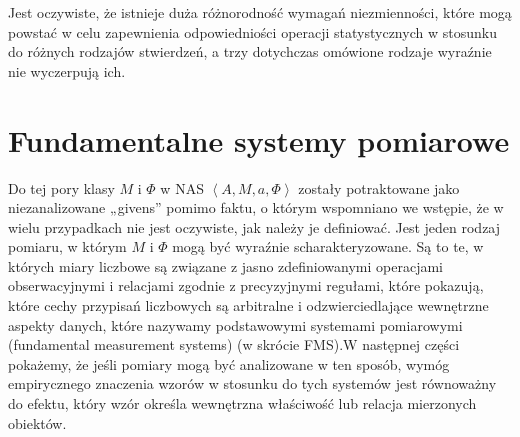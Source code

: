 \documentclass[12pt,a4paper]{report}
\newcommand{\tuple}[1]{\left\langle {#1} \right\rangle}
\begin{document}
Jest oczywiste, że istnieje duża różnorodność wymagań niezmienności, które mogą powstać w celu zapewnienia odpowiedniości operacji statystycznych w stosunku do różnych rodzajów stwierdzeń, a trzy dotychczas omówione rodzaje wyraźnie nie wyczerpują ich.
\section{Fundamentalne systemy pomiarowe}

Do tej pory klasy $M$ i $\Phi$ w NAS $\tuple{A,M,a,\Phi}$ zostały potraktowane jako niezanalizowane „givens” pomimo faktu, o którym wspomniano we wstępie, że w wielu przypadkach nie jest oczywiste, jak należy je definiować. Jest jeden rodzaj pomiaru, w którym $M$ i $\Phi$ mogą być wyraźnie scharakteryzowane. Są to te, w których miary liczbowe są związane z jasno zdefiniowanymi operacjami obserwacyjnymi i relacjami zgodnie z precyzyjnymi regułami, które pokazują, które cechy przypisań liczbowych są arbitralne i odzwierciedlające wewnętrzne aspekty danych, które nazywamy podstawowymi systemami pomiarowymi (fundamental measurement systems) (w skrócie FMS).W następnej części pokażemy, że jeśli pomiary mogą być analizowane w ten sposób, wymóg empirycznego znaczenia wzorów w stosunku do tych systemów jest równoważny do efektu, który wzór określa wewnętrzna właściwość lub relacja mierzonych obiektów.
\end{document}
